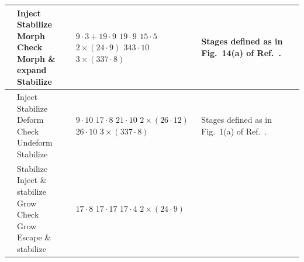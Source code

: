 \documentclass[%
    aps, 
    physrev,
    reprint,
]{revtex4-2}
\begin{document}
\begin{table}
\begin{tabular}{|c|l|l|l|}
   \cite{chen2025efficient} & 
    \makecell[l]{Inject \\
                Stabilize \\
                Morph \\
                Check \\
                Morph \& expand \\
                Stabilize} &
    \makecell[l]{$9\cdot 3 + 19 \cdot 9$ \\
                $19\cdot 9$ \\
                $15\cdot 5$ \\
                $2\times (24 \cdot 9)$ \\
                $343\cdot 10$ \\
                $3\times (337 \cdot 8)$} &
    Stages defined as in Fig.~14(a) of Ref.~\cite{chen2025efficient}.\\ \hline   
    \cite{claes2025cultivatingtstatessurface} & 
    \makecell[l]{Inject \\
                Stabilize \\
                Deform \\
                Check \\
                Undeform \\
                Stabilize} &
    \makecell[l]{$9\cdot 10$ \\
                $17 \cdot 8$ \\
                $21 \cdot 10$ \\
                $2\times (26 \cdot 12)$\\
                $26 \cdot 10$ \\
                $3\times (337 \cdot 8)$} &
    Stages defined as in Fig.~1(a) of Ref.~\cite{claes2025cultivatingtstatessurface}.\\ \hline  
    \cite{vaknin2025magic} & 
    \makecell[l]{Stabilize \\
                Inject \& stabilize \\
                Grow \\
                Check \\
                Grow \\
                Escape \& stabilize} &
    \makecell[l]{$17 \cdot 8$ \\
                $17 \cdot 17$ \\
                $17 \cdot 4$ \\
                $2\times (24 \cdot 9)$ \\
}
\end{tabular}
\end{table}
\end{document}
